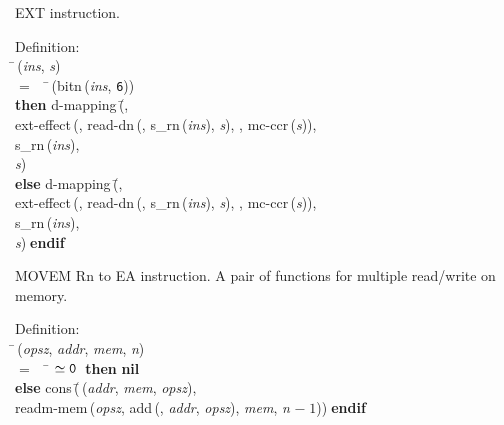  EXT instruction.
\begin{tabbing}{\sc Definition}: \\  
\=\,({\it{ins\/}}, {\it{s\/}}) \\ 
$=$$\;\;\;\;$\=\,({\rm{bitn}}\,({\it{ins\/}}, {\tt{6}})) \\ 
{\bf then }{\rm{d-mapping}}\,(\=, \\ 
{\rm{ext-effect}}\,({}, {\rm{read-dn}}\,({}, {\rm{s\_rn}}\,({\it{ins\/}}), {\it{s\/}}), {}, {\rm{mc-ccr}}\,({\it{s\/}})), \\ 
{\rm{s\_rn}}\,({\it{ins\/}}), \\ 
{\it{s\/}})\- \\ 
{\bf else }{\rm{d-mapping}}\,(\=, \\ 
{\rm{ext-effect}}\,({}, {\rm{read-dn}}\,({}, {\rm{s\_rn}}\,({\it{ins\/}}), {\it{s\/}}), {}, {\rm{mc-ccr}}\,({\it{s\/}})), \\ 
{\rm{s\_rn}}\,({\it{ins\/}}), \\ 
{\it{s\/}})\-$\;${\bf  endif}\-\-
\end{tabbing}

 MOVEM Rn to EA instruction.
 A pair of functions for multiple read/write on memory.
\begin{tabbing}{\sc Definition}: \\  
\=\,({\it{opsz\/}}, {\it{addr\/}}, {\it{mem\/}}, {\it{n\/}}) \\ 
$=$$\;\;\;\;$\= $\simeq {\tt{0}}$$\;\;${\bf then }{\bf{nil}} \\ 
{\bf else }{\rm{cons}}\,(\=\,({\it{addr\/}}, {\it{mem\/}}, {\it{opsz\/}}), \\ 
{\rm{readm-mem}}\,({\it{opsz\/}}, {\rm{add}}\,({}, {\it{addr\/}}, {\it{opsz\/}}), {\it{mem\/}}, {\it{n\/}} $-\;1$))\-$\;${\bf  endif}\-\-
\end{tabbing}

